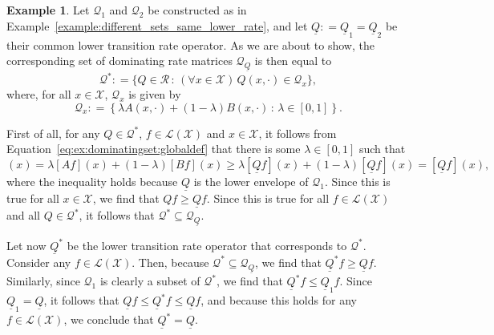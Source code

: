 \documentclass[10pt,a4paper]{paper}
\theoremstyle{definition}
\newtheorem{exmp}{Example}%
\newcommand{\states}{\mathcal{X}}
\newcommand{\gambles}{\mathcal{L}}
\newcommand{\gamblesX}{\gambles(\states)}
\newcommand{\rateset}{\mathcal{Q}}
\newcommand{\lrate}{\underline{Q}}
\newcommand{\coloneqq}{:\!=}
\begin{document}
\begin{exmp}\label{ex:dominatingset}
Let $\rateset_1$ and $\rateset_2$ be constructed as in Example~\ref{example:different_sets_same_lower_rate}, and let $\lrate\coloneqq\lrate_1=\lrate_2$ be their common lower transition rate operator. As we are about to show, the corresponding set of dominating rate matrices $\rateset_{\lrate}$ is then equal to
\begin{equation}\label{eq:ex:dominatingset:globaldef}
\rateset^* \coloneqq \{Q\in\mathcal{R}\,:\,(\forall x\in\states)\, Q(x,\cdot)\in\rateset_x\},
\end{equation}
where, for all $x\in\states$, $\rateset_x$ is given by
\begin{equation*}
\rateset_x \coloneqq \left\{\lambda A(x,\cdot)+(1-\lambda)B(x,\cdot)\,:\,\lambda\in[0,1]\right\}.
\end{equation*}

First of all, for any $Q\in\rateset^*$, $f\in\gamblesX$ and $x\in\states$, it follows from Equation~\eqref{eq:ex:dominatingset:globaldef} that there is some $\lambda\in[0,1]$ such that
\begin{equation*}
[Qf](x)=\lambda[Af](x)+(1-\lambda)[Bf](x)
\geq\lambda[\lrate f](x)+(1-\lambda)[\lrate f](x)
=[\lrate f](x),
\end{equation*}
where the inequality holds because $\lrate$ is the lower envelope of $\rateset_1$. Since this is true for all $x\in\states$, we find that $Qf\geq\lrate f$. Since this is true for all $f\in\gamblesX$ and all $Q\in\rateset^*$, it follows that $\rateset^*\subseteq\rateset_{\lrate}$. 


Let now $\lrate^*$ be the lower transition rate operator that corresponds to $\rateset^*$. Consider any $f\in\gamblesX$. Then, because $\rateset^*\subseteq\rateset_{\lrate}$, we find that $\lrate^*f\geq\lrate f$. Similarly, since $\rateset_1$ is clearly a subset of $\rateset^*$, we find that $\lrate^*f\leq\lrate_1f$. Since $\lrate_1=\lrate$, it follows that $\lrate f\leq \lrate^*f\leq \lrate f$, and because this holds for any $f\in\gamblesX$, we conclude that $\lrate^*=\lrate$.




\end{exmp}
\end{document}
